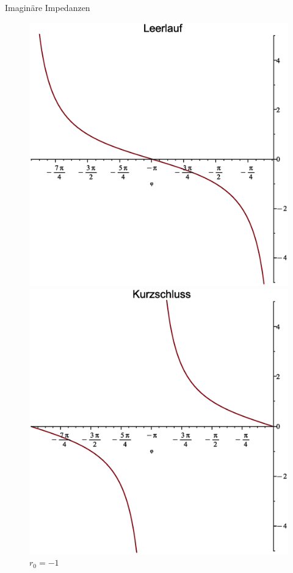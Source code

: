 \documentclass{beamer}
\begin{document}
\begin{frame}{Imaginäre Impedanzen}
\begin{figure}[H]
    \begin{minipage}{0.45\textwidth}
        \centering
        \includegraphics[width=\linewidth]{graphics/ImpedanzLeerlauf}
        \caption*{$r_{0}=1$}
    \end{minipage}
    \hfill
    \begin{minipage}{0.45\textwidth}
        \centering
        \includegraphics[width=\linewidth]{graphics/ImpedanzKurzschluss}
        \caption*{$r_{0}=-1$}
    \end{minipage}
\end{figure}
\end{frame}
\end{document}
